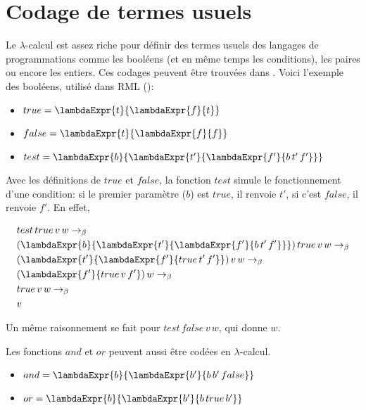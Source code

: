 \section{Codage de termes usuels}

Le $\lambda$-calcul est assez riche pour définir des
termes usuels des langages de programmations comme les booléens (et en même temps les
conditions), les paires ou encore les entiers. Ces codages peuvent être trouvées
dans \cite{tapl-untyped-lambda-calculus}. Voici l'exemple des booléens, utilisé dans RML (\cite{rml-github}):

\begin{itemize}
  \item $true = \lambdaExpr{t}{\lambdaExpr{f}{t}}$
  \item $false = \lambdaExpr{t}{\lambdaExpr{f}{f}}$
  \item $test = \lambdaExpr{b}{\lambdaExpr{t'}{\lambdaExpr{f'}{b \, t' \, f'}}}$
\end{itemize}

Avec les définitions de $true$ et $false$, la fonction $test$ simule le fonctionnement d'une condition: si le premier
paramètre ($b$) est $true$, il renvoie $t'$, si c'est $false$, il renvoie
$f'$. En effet,

\begin{align*}
  & test \, true \, v \, w \rightarrow_{\beta} \\
  & (\lambdaExpr{b}{\lambdaExpr{t'}{\lambdaExpr{f'}{b \, t' \, f'}}}) \, true \, v \, w \rightarrow_{\beta} \\
  & (\lambdaExpr{t'}{\lambdaExpr{f'}{true \, t' \, f'}}) \, v \, w \rightarrow_{\beta} \\
  & (\lambdaExpr{f'}{true \, v \, f'}) \, w \rightarrow_{\beta} \\
  & true \, v \, w \rightarrow_{\beta} \\
  & v
\end{align*}

Un même raisonnement se fait pour $test \, false \, v \, w$, qui donne $w$.

Les fonctions $and$ et $or$ peuvent aussi être codées en
$\lambda$-calcul.

\begin{itemize}
  \item $and = \lambdaExpr{b}{\lambdaExpr{b'}{b \, b' \, false}}$
  \item $or = \lambdaExpr{b}{\lambdaExpr{b'}{b \, true \, b'}}$
\end{itemize}